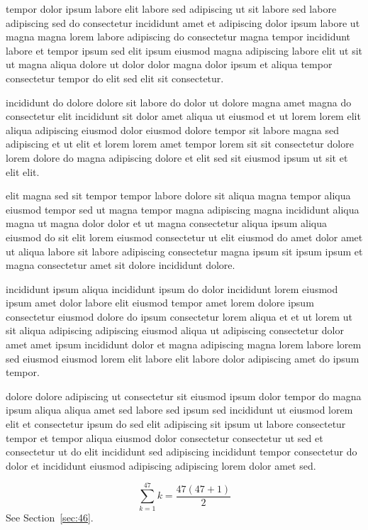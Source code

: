 \documentclass{article}
\begin{document}
tempor dolor ipsum labore elit labore sed adipiscing ut sit labore sed labore adipiscing sed do consectetur incididunt amet et adipiscing dolor ipsum labore ut magna magna lorem labore adipiscing do consectetur magna tempor incididunt labore et tempor ipsum sed elit ipsum eiusmod magna adipiscing labore elit ut sit ut magna aliqua dolore ut dolor dolor magna dolor ipsum et aliqua tempor consectetur tempor do elit sed elit sit consectetur.

incididunt do dolore dolore sit labore do dolor ut dolore magna amet magna do consectetur elit incididunt sit dolor amet aliqua ut eiusmod et ut lorem lorem elit aliqua adipiscing eiusmod dolor eiusmod dolore tempor sit labore magna sed adipiscing et ut elit et lorem lorem amet tempor lorem sit sit consectetur dolore lorem dolore do magna adipiscing dolore et elit sed sit eiusmod ipsum ut sit et elit elit.

elit magna sed sit tempor tempor labore dolore sit aliqua magna tempor aliqua eiusmod tempor sed ut magna tempor magna adipiscing magna incididunt aliqua magna ut magna dolor dolor et ut magna consectetur aliqua ipsum aliqua eiusmod do sit elit lorem eiusmod consectetur ut elit eiusmod do amet dolor amet ut aliqua labore sit labore adipiscing consectetur magna ipsum sit ipsum ipsum et magna consectetur amet sit dolore incididunt dolore.

incididunt ipsum aliqua incididunt ipsum do dolor incididunt lorem eiusmod ipsum amet dolor labore elit eiusmod tempor amet lorem dolore ipsum consectetur eiusmod dolore do ipsum consectetur lorem aliqua et et ut lorem ut sit aliqua adipiscing adipiscing eiusmod aliqua ut adipiscing consectetur dolor amet amet ipsum incididunt dolor et magna adipiscing magna lorem labore lorem sed eiusmod eiusmod lorem elit labore elit labore dolor adipiscing amet do ipsum tempor.

dolore dolore adipiscing ut consectetur sit eiusmod ipsum dolor tempor do magna ipsum aliqua aliqua amet sed labore sed ipsum sed incididunt ut eiusmod lorem elit et consectetur ipsum do sed elit adipiscing sit ipsum ut labore consectetur tempor et tempor aliqua eiusmod dolor consectetur consectetur ut sed et consectetur ut do elit incididunt sed adipiscing incididunt tempor consectetur do dolor et incididunt eiusmod adipiscing adipiscing lorem dolor amet sed.

\begin{equation} \sum_{k=1}^{47} k = \frac{47(47+1)}{2} \end{equation}
See Section~\ref{sec:46}.
\end{document}
